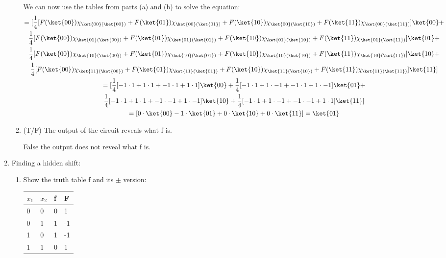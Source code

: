 \documentclass[]{article}
\begin{document}
\begin{enumerate}
\begin{enumerate}
            We can now use the tables from parts (a) and (b) to solve the equation:
            \begin{gather*}
              = [\frac{1}{4}[
                F(\ket{00})\chi_{\ket{00}(\ket{00})}+
                F(\ket{01})\chi_{\ket{00}(\ket{01})}+
                F(\ket{10})\chi_{\ket{00}(\ket{10})}+
                F(\ket{11})\chi_{\ket{00}(\ket{11})}
              ]\ket{00}+ \\
              \frac{1}{4}[
                F(\ket{00})\chi_{\ket{01}(\ket{00})}+
                F(\ket{01})\chi_{\ket{01}(\ket{01})}+
                F(\ket{10})\chi_{\ket{01}(\ket{10})}+
                F(\ket{11})\chi_{\ket{01}(\ket{11})}
              ]\ket{01}+\\
              \frac{1}{4}[
                F(\ket{00})\chi_{\ket{10}(\ket{00})}+
                F(\ket{01})\chi_{\ket{10}(\ket{01})}+
                F(\ket{10})\chi_{\ket{10}(\ket{10})}+
                F(\ket{11})\chi_{\ket{10}(\ket{11})}             
              ]\ket{10}+\\
              \frac{1}{4}[
                F(\ket{00})\chi_{\ket{11}(\ket{00})}+
                F(\ket{01})\chi_{\ket{11}(\ket{01})}+
                F(\ket{10})\chi_{\ket{11}(\ket{10})}+
                F(\ket{11})\chi_{\ket{11}(\ket{11})}
              ]\ket{11}] \\
              = [
              \frac{1}{4}[-1 \cdot 1 + 1 \cdot 1 + -1 \cdot 1 + 1 \cdot 1]\ket{00}+
              \frac{1}{4}[-1 \cdot 1 + 1 \cdot -1 + -1 \cdot 1 + 1 \cdot -1]\ket{01}+\\
              \frac{1}{4}[-1 \cdot 1 + 1 \cdot 1 + -1 \cdot -1 + 1 \cdot -1]\ket{10}+
              \frac{1}{4}[-1 \cdot 1 + 1 \cdot -1 + -1 \cdot -1 + 1 \cdot 1]\ket{11}] \\
              = [0 \cdot \ket{00} - 1 \cdot \ket{01} + 0 \cdot \ket{10} + 0 \cdot \ket{11}]
              = \ket{01}
            \end{gather*}
          \item (T/F) The output of the circuit reveals what f is.

            False the output does not reveal what f is.
        \end{enumerate} 

      \pagebreak
      \item Finding a hidden shift:
        \begin{enumerate}
          \item Show the truth table f and its $\pm$ version:
            \begin{table}[h]
              \centering
            \begin{tabular}{ll|l|l}
            $x_1$ & $x_2$ & f & F  \\ \hline
            0   & 0   & 0 & 1 \\
            0   & 1   & 1 & -1 \\
            1   & 0   & 1 & -1 \\
            1   & 1   & 0 & 1
            \end{tabular}
            \end{table}


\end{enumerate}
\end{enumerate}
\end{document}
